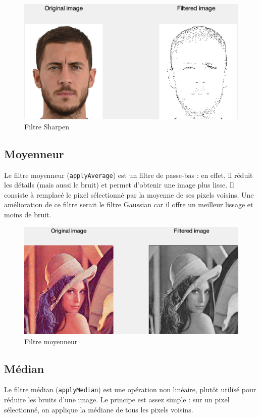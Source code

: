 \documentclass[12pt,a4paper]{article}
\begin{document}
\begin{figure}[H]
\centering
\includegraphics[scale=0.5]{img/sharpen}
\caption{Filtre Sharpen}
\end{figure}

\subsection{Moyenneur}
Le filtre moyenneur (\texttt{applyAverage}) est un filtre de passe-bas : en effet, il réduit les détails (mais aussi le bruit) et permet d'obtenir une image plus lisse. Il consiste à remplacé le pixel sélectionné par la moyenne de ses pixels voisins. Une amélioration de ce filtre serait le filtre Gaussian car il offre un meilleur lissage et moins de bruit.

\begin{figure}[H]
\centering
\includegraphics[scale=0.5]{img/average}
\caption{Filtre moyenneur}
\end{figure}

\subsection{Médian}
Le filtre médian (\texttt{applyMedian}) est une opération non linéaire, plutôt utilisé pour réduire les bruits d'une image. Le principe est assez simple : sur un pixel sélectionné, on applique la médiane de tous les pixels voisins.
\end{document}
